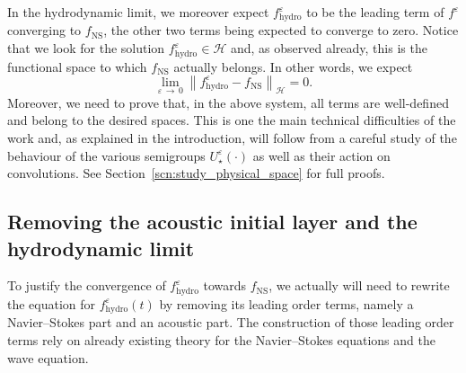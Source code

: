 \documentclass[AHL,Unicode,longabstracts,published]{cedram}
\newcommand{\ns}{\mathrm{NS}}
\newcommand{\hyd}{\mathrm{hydro}}
\newcommand{\HHH}{\mathscr{H}}
\newcommand{\SSSs}{\HHH}
\newcommand*\eps{{\varepsilon}}
\begin{document}
In the hydrodynamic limit, we moreover expect $f^\eps_\hyd$ to be the leading term of $f^\eps$ converging to $f_\ns$, the other two terms being expected to converge to zero. Notice that we look for the solution $f^\eps_\hyd \in \SSSs$ and, as observed already, this is the functional space to which $f_\ns$ actually belongs. In other words, we expect
\[
\lim_{\eps\,\to\,0}\left\| f_\hyd^\eps-f_\ns \right\|_{\SSSs}=0.
\]
Moreover, we need to prove that, in the above system, all terms are well-defined and belong to the desired spaces. This is one the main technical difficulties of the work and, as explained in the introduction, will follow from a careful study of the behaviour of the various semigroups $U^\eps_\star(\cdot)$ as well as their action on convolutions. See Section~\ref{scn:study_physical_space} for full proofs.


\subsection{Removing the acoustic initial layer and the hydrodynamic limit}



To justify the convergence of $f^\eps_\hyd$ towards $f_\ns$, we actually will need to rewrite the equation for $f^\eps_\hyd(t)$ by removing its leading order terms, namely a Navier--Stokes part and an acoustic part. The construction of those leading order terms rely on already existing theory for the Navier--Stokes equations and the wave equation.
\end{document}
